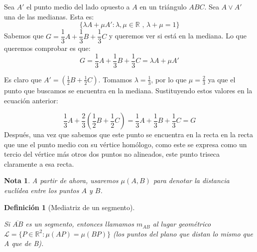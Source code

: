 \documentclass[11pt, a4paper]{article}
\makeatletter
\newif\IfInSansMode
\let\oldsf\sffamily
\renewcommand*{\sffamily}{\oldsf\mathversion{sans}\InSansModetrue}
\let\oldnorm\normalfont
\renewcommand*{\normalfont}{\oldnorm\InSansModefalse\mathversion{normal}}
\renewenvironment{proof}[1][\proofname] {\vspace{-15pt}\par\pushQED{\qed}\normalfont\topsep6\p@\@plus6\p@\relax\trivlist\item[\hskip\labelsep\it#1\@addpunct{.}]\ignorespaces}{\popQED\endtrivlist\@endpefalse}
\newcommand{\R}{\mathbb{R}}
\renewenvironment{proof}[1][\proofname] {\par\pushQED{\qed}\normalfont\topsep6\p@\@plus6\p@\relax\trivlist\item[\hskip\labelsep\itshape\sffamily#1\@addpunct{.}]\ignorespaces}{\popQED\endtrivlist\@endpefalse}
\theoremstyle{theorem-style}
\theoremstyle{definition-style}
\newtheorem{ndef}{Definición}[section]
\theoremstyle{remark-style}
\newtheorem*{nota}{Nota}
\theoremstyle{example-style}
\makeatother
\begin{document}
\begin{proof}
  Sea $A'$ el punto medio del lado opuesto a $A$ en un triángulo $ABC$. Sea $A \vee A'$ una de las medianas. Esta es:
  \[
    \{\lambda A + \mu A': \lambda, \mu \in \R \text{ , } \lambda+\mu = 1\}
  \]
  Sabemos que $G = \dfrac{1}{3} A +  \dfrac{1}{3} B +  \dfrac{1}{3} C$ y queremos ver si está en la mediana. Lo que queremos comprobar es que:
  \[
    G = \dfrac{1}{3} A +  \dfrac{1}{3} B +  \dfrac{1}{3} C = \lambda A + \mu A'  
  \]
  
  Es claro que $A' = \left(\frac{1}{2}B + \frac{1}{2}C\right)$. Tomamos $\lambda = \frac{1}{3}$, por lo que $\mu = \frac{2}{3}$ ya que el punto que buscamos se encuentra en la mediana. Sustituyendo estos valores en la ecuación anterior:
  
  $$\dfrac{1}{3}A + \dfrac{2}{3}\left(\dfrac{1}{2}B+\dfrac{1}{2}C\right) = \frac{1}{3}A + \frac{1}{3}B + \frac{1}{3}C = G$$
	Después, una vez que sabemos que este punto se encuentra en la recta en la recta que une el punto medio con su vértice homólogo, como este se expresa como un tercio del vértice más otros dos puntos no alineados, este punto triseca claramente a esa recta.
\end{proof}

\begin{nota}
  A partir de ahora, usaremos $\mu(A,B)$ para denotar la distancia euclídea entre los puntos $A$ y $B$.
\end{nota}

\begin{ndef}[Mediatriz de un segmento] \hfill\\
\begin{minipage}[c]{0.70\textwidth}
  Si $\overline{AB}$ es un segmento, entonces llamamos $m_{AB}$  al lugar geométrico $\mathcal{L}=\{P \in \R^2 : \mu(AP) = \mu(BP)\}$ (los puntos del plano que distan lo mismo que A que de B).
\end{minipage}
\begin{minipage}[]{0.27\textwidth}
  \begin{center}
  \sffamily
\end{center}
\end{minipage}
\end{ndef}
\end{document}

